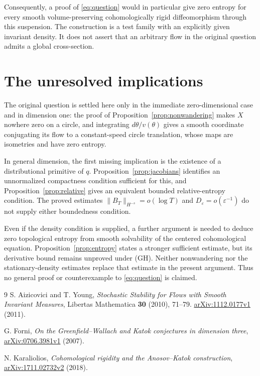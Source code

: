\documentclass[11pt]{article}
\theoremstyle{definition}
\theoremstyle{remark}
\newcommand{\eps}{\varepsilon}
\begin{document}
Consequently, a proof of \eqref{eq:question} would in particular give zero entropy for every smooth volume-preserving cohomologically rigid diffeomorphism through this suspension. The construction is a test family with an explicitly given invariant density. It does not assert that an arbitrary flow in the original question admits a global cross-section.

\section{The unresolved implications}

The original question is settled here only in the immediate zero-dimensional case and in dimension one: the proof of Proposition~\ref{prop:nonwandering} makes $X$ nowhere zero on a circle, and integrating $d\theta/v(\theta)$ gives a smooth coordinate conjugating its flow to a constant-speed circle translation, whose maps are isometries and have zero entropy.

In general dimension, the first missing implication is the existence of a distributional primitive of $q$. Proposition~\ref{prop:jacobians} identifies an unnormalized compactness condition sufficient for this, and Proposition~\ref{prop:relative} gives an equivalent bounded relative-entropy condition. The proved estimates $\|B_T\|_{H^{-s}}=o(\log T)$ and $D_\eps=o(\eps^{-1})$ do not supply either boundedness condition.

Even if the density condition is supplied, a further argument is needed to deduce zero topological entropy from smooth solvability of the centered cohomological equation. Proposition~\ref{prop:entropy} states a stronger sufficient estimate, but its derivative bound remains unproved under (GH). Neither nonwandering nor the stationary-density estimates replace that estimate in the present argument. Thus no general proof or counterexample to \eqref{eq:question} is claimed.

\begin{thebibliography}{9}
S. Aizicovici and T. Young,
\emph{Stochastic Stability for Flows with Smooth Invariant Measures},
Libertas Mathematica \textbf{30} (2010), 71--79.
\href{https://arxiv.org/abs/1112.0177v1}{arXiv:1112.0177v1} (2011).

G. Forni,
\emph{On the Greenfield--Wallach and Katok conjectures in dimension three},
\href{https://arxiv.org/abs/0706.3981v1}{arXiv:0706.3981v1} (2007).

N. Karaliolios,
\emph{Cohomological rigidity and the Anosov--Katok construction},
\href{https://arxiv.org/abs/1711.02732v2}{arXiv:1711.02732v2} (2018).
\end{thebibliography}
\end{document}
